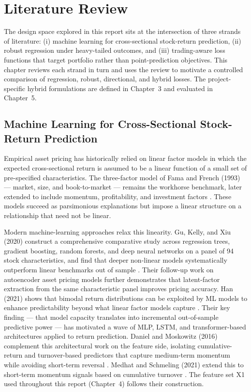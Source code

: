\chapter{Literature Review}\label{ch:literature_review}

The design space explored in this report sits at the intersection of three strands of literature: (i) machine learning for cross-sectional stock-return prediction, (ii) robust regression under heavy-tailed outcomes, and (iii) trading-aware loss functions that target portfolio rather than point-prediction objectives. This chapter reviews each strand in turn and uses the review to motivate a controlled comparison of regression, robust, directional, and hybrid losses. The project-specific hybrid formulations are defined in Chapter~3 and evaluated in Chapter~5.

\section{Machine Learning for Cross-Sectional Stock-Return Prediction}\label{sec:ml_cross_sectional}

Empirical asset pricing has historically relied on linear factor models in which the expected cross-sectional return is assumed to be a linear function of a small set of pre-specified characteristics. The three-factor model of Fama and French (1993) --- market, size, and book-to-market --- remains the workhorse benchmark, later extended to include momentum, profitability, and investment factors \cite{ref2}. These models succeed as parsimonious explanations but impose a linear structure on a relationship that need not be linear.

Modern machine-learning approaches relax this linearity. Gu, Kelly, and Xiu (2020) construct a comprehensive comparative study across regression trees, gradient boosting, random forests, and deep neural networks on a panel of 94 stock characteristics, and find that deeper non-linear models systematically outperform linear benchmarks out of sample \cite{ref1}. Their follow-up work on autoencoder asset pricing models \cite{ref9} further demonstrates that latent-factor extraction from the same characteristic panel improves pricing accuracy. Han (2021) shows that bimodal return distributions can be exploited by ML models to enhance predictability beyond what linear factor models capture \cite{ref10}. Their key finding --- that model capacity translates into incremental out-of-sample predictive power --- has motivated a wave of MLP, LSTM, and transformer-based architectures applied to return prediction. Daniel and Moskowitz (2016) complement this architectural work on the feature side, isolating cumulative-return and turnover-based predictors that capture medium-term momentum while avoiding short-term reversal \cite{ref3}. Medhat and Schmeling (2021) extend this to short-term momentum signals based on cumulative turnover \cite{ref11}. The feature set X1 used throughout this report (Chapter~4) follows their construction.

